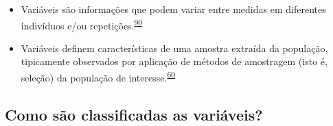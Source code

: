 \documentclass[
  a4paper,
]{book}
\begin{document}
\begin{itemize}
\item
  Variáveis são informações que podem variar entre medidas em diferentes indivíduos e/ou repetições.\textsuperscript{\protect\hyperlink{ref-Altman1999}{90}}
\item
  Variáveis definem características de uma amostra extraída da população, tipicamente observados por aplicação de métodos de amostragem (isto é, seleção) da população de interesse.\textsuperscript{\protect\hyperlink{ref-vetter2017}{60}}
\end{itemize}

\hypertarget{como-suxe3o-classificadas-as-variuxe1veis}{%
\subsection{Como são classificadas as variáveis?}\label{como-suxe3o-classificadas-as-variuxe1veis}}
\end{document}
